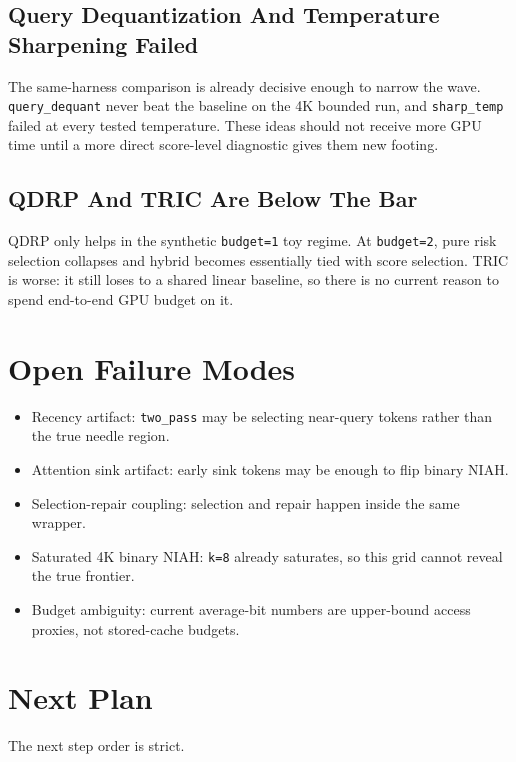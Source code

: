 \documentclass[11pt]{article}
\begin{document}
\subsection{Query Dequantization And Temperature Sharpening Failed}

The same-harness comparison is already decisive enough to narrow the wave.
\texttt{query\_dequant} never beat the baseline on the 4K bounded run, and
\texttt{sharp\_temp} failed at every tested temperature. These ideas should not receive
more GPU time until a more direct score-level diagnostic gives them new footing.

\subsection{QDRP And TRIC Are Below The Bar}

QDRP only helps in the synthetic \texttt{budget=1} toy regime. At \texttt{budget=2},
pure risk selection collapses and hybrid becomes essentially tied with score selection.
TRIC is worse: it still loses to a shared linear baseline, so there is no current reason
to spend end-to-end GPU budget on it.

\section{Open Failure Modes}

\begin{itemize}[leftmargin=1.5em]
\item Recency artifact: \texttt{two\_pass} may be selecting near-query tokens rather than the true needle region.
\item Attention sink artifact: early sink tokens may be enough to flip binary NIAH.
\item Selection-repair coupling: selection and repair happen inside the same wrapper.
\item Saturated 4K binary NIAH: \texttt{k=8} already saturates, so this grid cannot reveal the true frontier.
\item Budget ambiguity: current average-bit numbers are upper-bound access proxies, not stored-cache budgets.
\end{itemize}

\section{Next Plan}

The next step order is strict.
\end{document}
